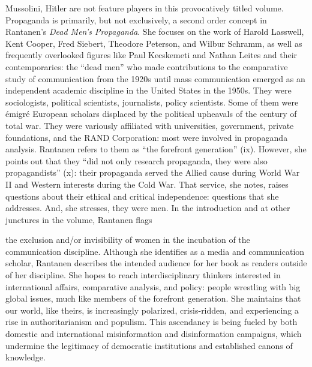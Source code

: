 \documentclass{tufte-handout}
\begin{document}
\begin{titlepage}
\vspace{0.2in}

 Mussolini, Hitler are not feature players in this
provocatively titled volume. Propaganda is primarily, but not
exclusively, a second order concept in Rantanen's \emph{Dead Men's
Propaganda}. She focuses on the work of Harold Lasswell, Kent Cooper,
Fred Siebert, Theodore Peterson, and Wilbur Schramm, as well as
frequently overlooked figures like Paul Kecskemeti and Nathan Leites and
their contemporaries: the ``dead men'' who made contributions to the
comparative study of communication from the 1920s until mass
communication emerged as an independent academic discipline in the
United States in the 1950s. They were sociologists, political
scientists, journalists, policy scientists. Some of them were émigré
European scholars displaced by the political upheavals of the century of
total war. They were variously affiliated with universities, government,
private foundations, and the RAND Corporation: most were involved in
propaganda analysis. Rantanen refers to them as ``the forefront
generation'' (ix). However, she points out that they ``did not only
research propaganda, they were also propagandists'' (x): their
propaganda served the Allied cause during World War II and Western
interests during the Cold War. That service, she notes, raises questions
about their ethical and critical independence: questions that she
addresses. And, she stresses, they were men. In the introduction and at
other junctures in the volume, Rantanen flags

\enlargethispage{2\baselineskip}

\vspace*{3em}



 \end{titlepage}




\noindent the exclusion and/or
invisibility of women in the incubation of the communication discipline. Although she identifies as a media and communication scholar, Rantanen
describes the intended audience for her book as readers outside of her
discipline. She hopes to reach interdisciplinary thinkers interested in
international affairs, comparative analysis, and policy: people
wrestling with big global issues, much like members of the forefront
generation. She maintains that our world, like theirs, is increasingly
polarized, crisis-ridden, and experiencing a rise in authoritarianism
and populism. This ascendancy is being fueled by both domestic and
international misinformation and disinformation campaigns, which
undermine the legitimacy of democratic institutions and established
canons of knowledge.
\end{document}
